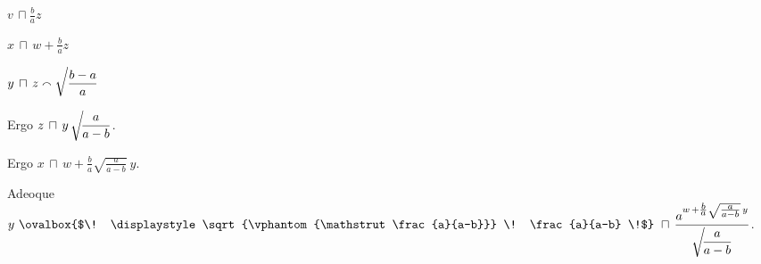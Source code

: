 \rule[-4mm]{0mm}{10mm} $\displaystyle v \, \sqcap \frac{b}{a} z$\\ 
\rule[-4mm]{0mm}{10mm} $\displaystyle x \, \sqcap \, w + \frac{b}{a} z$\\ 
\rule[-4mm]{0mm}{10mm} $\displaystyle y \, \sqcap \, z \smallfrown \sqrt{\vphantom{\mathstrut \frac{b-a}{a}}} \frac{b-a}{a}$\\ 
\rule[-4mm]{0mm}{10mm} Ergo $\displaystyle z \, \sqcap \, y \, \sqrt{\vphantom{\mathstrut \frac{a}{a-b}}} \! \frac{a}{a-b}$.\\ 
\rule[-4mm]{0mm}{10mm} Ergo $\displaystyle x \, \sqcap \, w + \frac{b}{a} \sqrt{\frac{a}{a-b}} \ y$.\\ 
\rule[-4mm]{0mm}{10mm} Adeoque $\displaystyle y\, \, \ovalbox{$\! \displaystyle\sqrt{\vphantom{\mathstrut \frac{a}{a-b}}} \! \frac{a}{a-b} \!$} \ \sqcap \, \frac{\displaystyle a^{\scriptstyle w \, + \frac{\scriptstyle b}{\scriptstyle a} \sqrt{\frac{\scriptstyle a}{\scriptstyle a-b}} \, \scriptstyle y}}{\displaystyle\sqrt{\vphantom{\mathstrut \frac{a}{a-b}}} \! \frac{a}{a-b}}$.
\pend
\count{}
\count{}
\count{}
\newpage